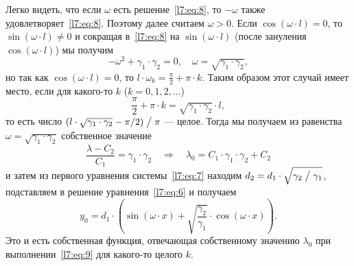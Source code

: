 Легко видеть, что если $\omega$ есть решение~\eqref{l7:eq:8}, то $-\omega$ также удовлетворяет~\eqref{l7:eq:8}. Поэтому далее считаем $\omega>0$. Если $\cos(\omega\cdot l)=0$, то $\sin(\omega\cdot l)\neq0$ и сокращая в~\eqref{l7:eq:8} на $\sin(\omega\cdot l)$ (после зануления $\cos(\omega\cdot l)$) мы получим 
\begin{equation*}
	-\omega^2+\gamma_1\cdot\gamma_2=0,\quad\omega=\sqrt{\gamma_1\cdot\gamma_2},
\end{equation*}
но так как $\cos(\omega\cdot l)=0$, то $l\cdot\omega_k=\displaystyle\frac{\pi}{2}+\pi\cdot k$. Таким образом этот случай имеет место, если для какого-то $k$ ($k=0,1,2,\ldots$)
\begin{equation}
	\label{l7:eq:9}
	\frac{\pi}{2}+\pi\cdot k=\sqrt{\gamma_1\cdot\gamma_2}\cdot l,
\end{equation} 
то есть число $(l\cdot\sqrt{\gamma_1\cdot\gamma_2}-\pi/2)\bigm/\pi$ --- целое.  Тогда мы получаем из равенства $\omega=\sqrt{\gamma_1\cdot\gamma_2}$ собственное значение 
\begin{equation*}
	\frac{\lambda-C_2}{C_1}=\gamma_1\cdot\gamma_2\quad\Rightarrow\quad\lambda_0=C_1\cdot\gamma_1\cdot\gamma_2+C_2
\end{equation*}
и затем из первого уравнения системы~\eqref{l7:eq:7} находим $d_2=d_1\cdot\sqrt{\gamma_2\bigm/\gamma_1}$, подставляем в решение уравнения~\eqref{l7:eq:6} и получаем 
\begin{equation*}
	 y_0=d_1\cdot\left(\sin(\omega\cdot x)+\sqrt{\frac{\gamma_2}{\gamma_1}}\cdot\cos(\omega\cdot x)\right).
\end{equation*}
Это и есть собственная функция, отвечающая собственному значению $\lambda_0$ при выполнении~\eqref{l7:eq:9} для какого-то целого $k$. 

